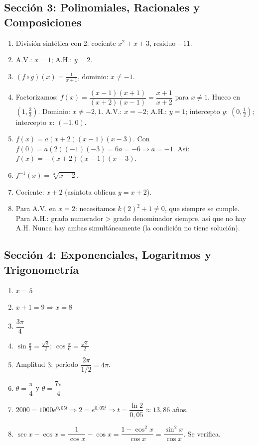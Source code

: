 \documentclass[12pt, letterpaper]{article}
\begin{document}
\subsection*{Sección 3: Polinomiales, Racionales y Composiciones}

\begin{enumerate}[resume=soluciones, leftmargin=*, label=\textbf{\arabic*.}]
  \item División sintética con 2: cociente $x^2 + x + 3$, residuo $-11$.
  \item A.V.: $x = 1$; A.H.: $y = 2$.
  \item $(f \circ g)(x) = \frac{1}{x + 1}$, dominio: $x \neq -1$.
  \item Factorizamos: $f(x) = \dfrac{(x - 1)(x + 1)}{(x + 2)(x - 1)} = \dfrac{x + 1}{x + 2}$ para $x \neq 1$. Hueco en $(1, \frac{2}{3})$. Dominio: $x \neq -2, 1$. A.V.: $x = -2$; A.H.: $y = 1$; intercepto $y$: $(0, \frac{1}{2})$; intercepto $x$: $(-1, 0)$.
  \item $f(x) = a(x + 2)(x - 1)(x - 3)$. Con $f(0) = a(2)(-1)(-3) = 6a = -6 \Rightarrow a = -1$. Así: $f(x) = -(x + 2)(x - 1)(x - 3)$.
  \item $f^{-1}(x) = \sqrt[3]{x - 2}$.
  \item Cociente: $x + 2$ (asíntota oblicua $y = x + 2$).
  \item Para A.V. en $x = 2$: necesitamos $k(2)^2 + 1 \neq 0$, que siempre se cumple. Para A.H.: grado numerador > grado denominador siempre, así que no hay A.H. Nunca hay ambas simultáneamente (la condición no tiene solución).
\end{enumerate}

\subsection*{Sección 4: Exponenciales, Logaritmos y Trigonometría}

\begin{enumerate}[resume=soluciones, leftmargin=*, label=\textbf{\arabic*.}]
  \item $x = 5$
  \item $x + 1 = 9 \Rightarrow x = 8$
  \item $\dfrac{3\pi}{4}$
  \item $\sin\frac{\pi}{3} = \frac{\sqrt{3}}{2}$; $\cos\frac{\pi}{6} = \frac{\sqrt{3}}{2}$
  \item Amplitud $3$; período $\dfrac{2\pi}{1/2} = 4\pi$.
  \item $\theta = \dfrac{\pi}{4}$ y $\theta = \dfrac{7\pi}{4}$
  \item $2000 = 1000e^{0{,}05t} \Rightarrow 2 = e^{0{,}05t} \Rightarrow t = \dfrac{\ln 2}{0{,}05} \approx 13{,}86$ años.
  \item $\sec x - \cos x = \dfrac{1}{\cos x} - \cos x = \dfrac{1 - \cos^2 x}{\cos x} = \dfrac{\sin^2 x}{\cos x}$. Se verifica.
\end{enumerate}
\end{document}
